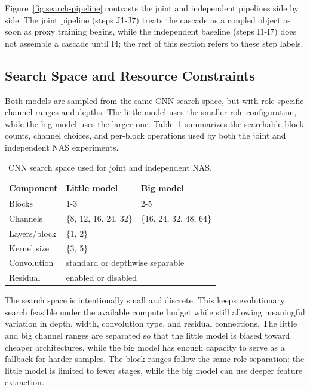 \documentclass[conference]{IEEEtran}
\begin{document}
Figure~\ref{fig:search-pipeline} contrasts the joint and independent
pipelines side by side. The joint pipeline (steps J1-J7) treats the
cascade as a coupled object as soon as proxy training begins, while the
independent baseline (steps I1-I7) does not assemble a cascade until I4;
the rest of this section refers to these step labels.

\subsection{Search Space and Resource Constraints}

Both models are sampled from the same CNN search space, but with role-specific channel ranges and depths. The little model uses the smaller role configuration, while the big model uses the larger one. Table~\ref{tab:search-space} summarizes the searchable block counts, channel choices, and per-block operations used by both the joint and independent NAS experiments.

\begin{table}[t]
\centering
\caption{CNN search space used for joint and independent NAS.}
\label{tab:search-space}
\begin{tabular}{lll}
\toprule
\textbf{Component} & \textbf{Little model} & \textbf{Big model} \\
\midrule
Blocks & 1-3 & 2-5 \\
Channels & \{8, 12, 16, 24, 32\} & \{16, 24, 32, 48, 64\} \\
Layers/block & \multicolumn{2}{l}{\{1, 2\}} \\
Kernel size & \multicolumn{2}{l}{\{3, 5\}} \\
Convolution & \multicolumn{2}{l}{standard or depthwise separable} \\
Residual & \multicolumn{2}{l}{enabled or disabled} \\
\bottomrule
\end{tabular}
\end{table}

The search space is intentionally small and discrete. This keeps evolutionary
search feasible under the available compute budget while still allowing
meaningful variation in depth, width, convolution type, and residual
connections. The little and big channel ranges are separated so that the little
model is biased toward cheaper architectures, while the big model has enough
capacity to serve as a fallback for harder samples. The block ranges follow the
same role separation: the little model is limited to fewer stages, while the big
model can use deeper feature extraction.
\end{document}
